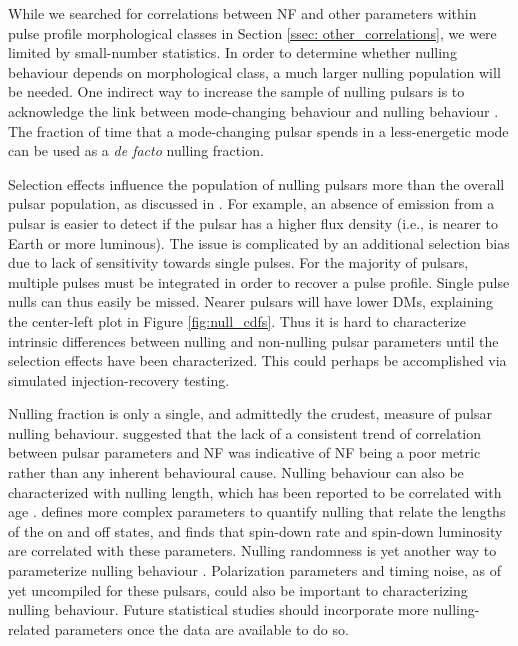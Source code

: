 \documentclass[fleqn,usenatbib]{mnras}
\begin{document}
While we searched for correlations between NF and other parameters within pulse profile morphological classes in Section \ref{ssec: other_correlations}, we were limited by small-number statistics. In order to determine whether nulling behaviour depends on morphological class, a much larger nulling population will be needed. One indirect way to increase the sample of nulling pulsars is to acknowledge the link between mode-changing behaviour and nulling behaviour \citep[e.g., ][]{Timokhin2010}. The fraction of time that a mode-changing pulsar spends in a less-energetic mode can be used as a \textit{de facto} nulling fraction.

Selection effects influence the population of nulling pulsars more than the overall pulsar population, as discussed in \citet{biggs1992analysis}. For example, an absence of emission from a pulsar is easier to detect if the pulsar has a higher flux density (i.e., is nearer to Earth or more luminous). The issue is complicated by an additional selection bias due to lack of sensitivity towards single pulses. For the majority of pulsars, multiple pulses must be integrated in order to recover a pulse profile.  Single pulse nulls can thus easily be missed. Nearer pulsars will have lower DMs, explaining the center-left plot in Figure \ref{fig:null_cdfs}. Thus it is hard to characterize intrinsic differences between nulling and non-nulling pulsar parameters until the selection effects have been characterized. This could perhaps be accomplished via simulated injection-recovery testing.

Nulling fraction is only a single, and admittedly the crudest, measure of pulsar nulling behaviour. \citet{gajjar2017absence} suggested that the lack of a consistent trend of correlation between pulsar parameters and NF was indicative of NF being a poor metric rather than any inherent behavioural cause. Nulling behaviour can also be characterized with nulling length, which has been reported to be correlated with age \citep{Lazaridis2006}. \citet{Yang2014} defines more complex parameters to quantify nulling that relate the lengths of the on and off states, and finds that spin-down rate and spin-down luminosity are correlated with these parameters. Nulling randomness is yet another way to parameterize nulling behaviour \citep{gajjar2017absence}. Polarization parameters and timing noise, as of yet uncompiled for these pulsars, could also be important to characterizing nulling behaviour. Future statistical studies should incorporate more nulling-related parameters once the data are available to do so.
\end{document}
